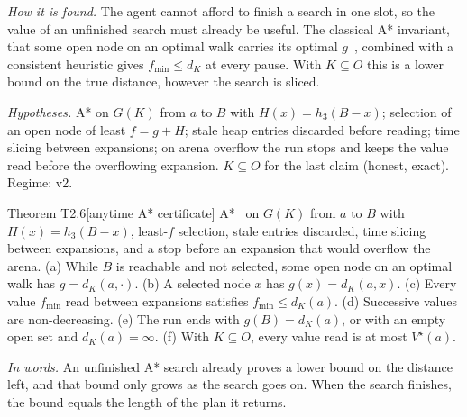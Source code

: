 \documentclass[11pt,a4paper]{article}
\newcommand{\Vs}{V^\star}
\begin{document}
\noindent\emph{How it is found.} The agent cannot afford to finish a search in one slot, so the value of an unfinished search must already be useful.
The classical A* invariant, that some open node on an optimal walk carries its optimal $g$~\cite{hart}, combined with a
consistent heuristic gives $f_{\min}\le d_K$ at every pause. With $K\subseteq O$ this is a lower bound on the true
distance, however the search is sliced.

\noindent\emph{Hypotheses.} A* on $G(K)$ from $a$ to $B$ with $H(x)=h_3(B-x)$; selection of an open node of least $f=g+H$; stale
heap entries discarded before reading; time slicing between expansions; on arena overflow the run stops and keeps the
value read before the overflowing expansion. $K\subseteq O$ for the last claim (honest, exact). Regime: v2.

\begin{result}{Theorem T2.6}[anytime A* certificate]
A*~\cite{hart} on $G(K)$ from $a$ to $B$ with $H(x)=h_3(B-x)$, least-$f$ selection, stale entries discarded, time slicing between
expansions, and a stop before an expansion that would overflow the arena. (a) While $B$ is reachable and not selected,
some open node on an optimal walk has $g=d_K(a,\cdot)$. (b) A selected node $x$ has $g(x)=d_K(a,x)$. (c) Every value
$f_{\min}$ read between expansions satisfies $f_{\min}\le d_K(a)$. (d) Successive values are non-decreasing. (e) The run
ends with $g(B)=d_K(a)$, or with an empty open set and $d_K(a)=\infty$. (f) With $K\subseteq O$, every value read is
at most $\Vs(a)$.
\end{result}
\noindent\emph{In words.} An unfinished A* search already proves a lower bound on the distance left, and that bound only grows as the search goes on. When the search finishes, the bound equals the length of the plan it returns.
\end{document}
